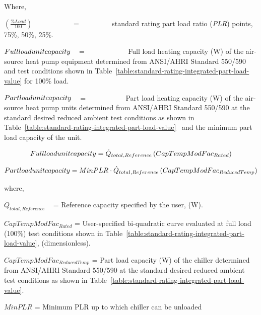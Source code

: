 Where,

\emph{\(\left( {\frac{{\% Load}}{{100}}} \right)\)}~~~~~~~~~~~ = ~~~~~~~~ standard rating part load ratio (\emph{PLR}) points, 75\%, 50\%, 25\%.

\(Full{\rm{ }}load{\rm{ }}unit{\rm{ }}capacity\) ~ = ~~~~~~~~~~~ Full load heating capacity (W) of the air-source heat pump equipment determined from ANSI/AHRI Standard 550/590 and test conditions shown in Table~\ref{table:standard-rating-integrated-part-load-value} for 100\% load.

\(Part{\rm{ }}load{\rm{ }}unit{\rm{ }}capacity\) ~ = ~~~~~~~~~~ Part load heating capacity (W) of the air-source heat pump units determined from ANSI/AHRI Standard 550/590 at the standard desired reduced ambient test conditions as shown in Table~\ref{table:standard-rating-integrated-part-load-value} ~and the minimum part load capacity of the unit.

\begin{equation}
Full{\rm{ }}load{\rm{ }}unit{\rm{ }}capacity = {\dot Q_{total,Reference}}\left( {CapTempModFa{c_{Rated}}} \right)
\end{equation}

\begin{equation}
Part{\rm{ }}load{\rm{ }}unit{\rm{ }}capacity = MinPLR \cdot {\dot Q_{total,Reference}}\left( {CapTempModFa{c_{ReducedTemp}}} \right)
\end{equation}

where,

\({\dot Q_{total,Reference}}\) ~ = Reference capacity specified by the user, (W).

\(CapTempModFa{c_{Rated}}\) = User-specified bi-quadratic curve evaluated at full load (100\%) test conditions shown in Table~\ref{table:standard-rating-integrated-part-load-value}, (dimensionless).

\(CapTempModFa{c_{ReducedTemp}}\) = Part load capacity (W) of the chiller determined from ANSI/AHRI Standard 550/590 at the standard desired reduced ambient test conditions as shown in Table~\ref{table:standard-rating-integrated-part-load-value}.

\(MinPLR\) = Minimum PLR up to which chiller can be unloaded

